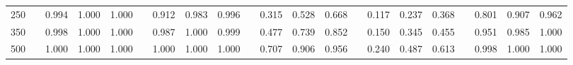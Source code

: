 % 
\begin{tabular}{ccccccccccccccccccccc}
  \hline
  \hline
250 &  & 0.994 & 1.000 & 1.000 &  & 0.912 & 0.983 & 0.996 &  & 0.315 & 0.528 & 0.668 &  & 0.117 & 0.237 & 0.368 &  & 0.801 & 0.907 & 0.962 \\ 
  350 &  & 0.998 & 1.000 & 1.000 &  & 0.987 & 1.000 & 0.999 &  & 0.477 & 0.739 & 0.852 &  & 0.150 & 0.345 & 0.455 &  & 0.951 & 0.985 & 1.000 \\ 
  500 &  & 1.000 & 1.000 & 1.000 &  & 1.000 & 1.000 & 1.000 &  & 0.707 & 0.906 & 0.956 &  & 0.240 & 0.487 & 0.613 &  & 0.998 & 1.000 & 1.000 \\ 
   \hline
\end{tabular}
